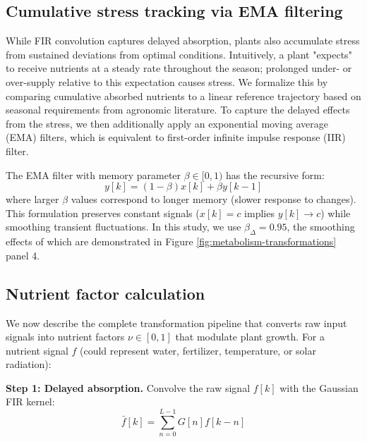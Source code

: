 \documentclass[preprint,12pt]{elsarticle}
\begin{document}
\subsection{Cumulative stress tracking via EMA filtering}\label{subsec:ema-smooth}

While FIR convolution captures delayed absorption, plants also accumulate stress from sustained deviations from optimal conditions. Intuitively, a plant "expects" to receive nutrients at a steady rate throughout the season; prolonged under- or over-supply relative to this expectation causes stress. We formalize this by comparing cumulative absorbed nutrients to a linear reference trajectory based on seasonal requirements from agronomic literature. To capture the delayed effects from the stress, we then additionally apply an exponential moving average (EMA) filters, which is equivalent to first-order infinite impulse response (IIR) filter.  

The EMA filter with memory parameter $\beta \in [0,1)$ has the recursive form:
\begin{equation}
y[k] = (1 - \beta)x[k] + \beta y[k-1]
\label{eqn:iir-filter}
\end{equation}
where larger $\beta$ values correspond to longer memory (slower response to changes). This formulation preserves constant signals ($x[k] = c$ implies $y[k] \rightarrow c$) while smoothing transient fluctuations. In this study, we use $\beta_{\Delta} = 0.95$, the smoothing effects of which are demonstrated in Figure \ref{fig:metabolism-transformations} panel 4.

\subsection{Nutrient factor calculation}\label{subsec:nutrient-factors}

We now describe the complete transformation pipeline that converts raw input signals into nutrient factors $\nu \in [0,1]$ that modulate plant growth. For a nutrient signal $f$ (could represent water, fertilizer, temperature, or solar radiation):

\textbf{Step 1: Delayed absorption.} Convolve the raw signal $f[k]$ with the Gaussian FIR kernel:
\begin{equation}
\bar{f}[k] = \sum_{n=0}^{L-1} G[n]f[k-n]
\label{eqn:delayed-trans}
\end{equation}
\end{document}
